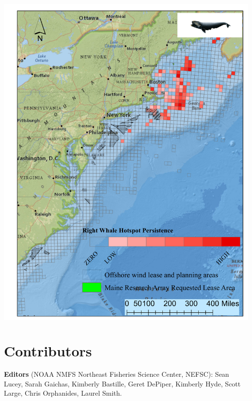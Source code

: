 \documentclass[
  10pt,
]{article}
\let\origfigure\figure
\let\endorigfigure\endfigure
\renewenvironment{figure}[1][2] {
    \expandafter\origfigure\expandafter[H]
} {
    \endorigfigure
}
\begin{document}
\begin{figure}

{\centering \includegraphics[width=0.6\linewidth]{images/NARW_hotpsot_persistence_2_1_2022_TPW} 

}

\caption{Northern Right Whale persistent hotspots and Wind Energy Areas.}\label{fig:whales-wind}
\end{figure}

\newpage{}

\hypertarget{contributors}{%
\section{Contributors}\label{contributors}}

\textbf{Editors} (NOAA NMFS Northeast Fisheries Science Center, NEFSC): Sean Lucey, Sarah Gaichas, Kimberly Bastille, Geret DePiper, Kimberly Hyde, Scott Large, Chris Orphanides, Laurel Smith.
\end{document}
